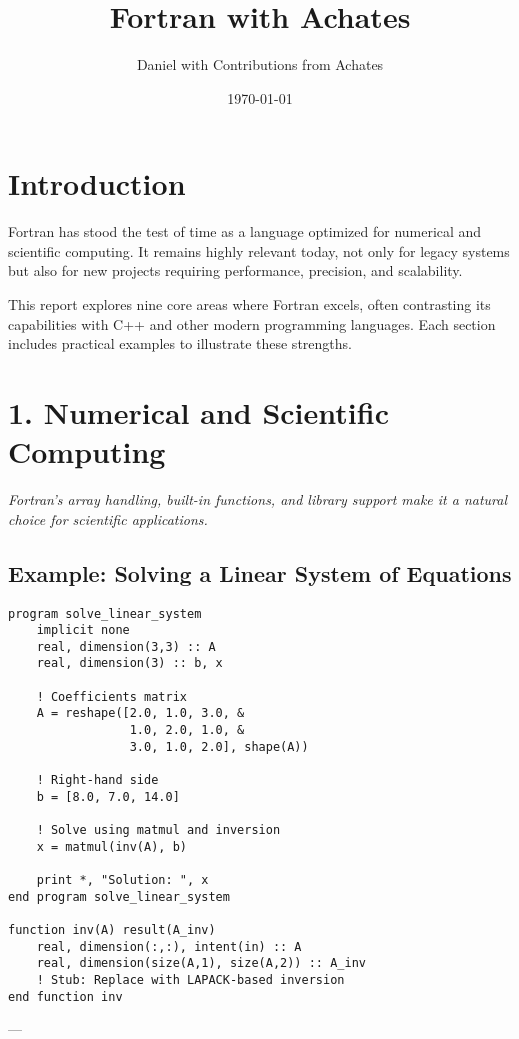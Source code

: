\documentclass[a4paper,11pt]{article}
\title{Fortran with Achates}
\author{Daniel with Contributions from Achates}
\date{\today}
\begin{document}
\maketitle
\tableofcontents
\newpage

\section{Introduction}
Fortran has stood the test of time as a language optimized for numerical and scientific computing. It remains highly relevant today, not only for legacy systems but also for new projects requiring performance, precision, and scalability.

This report explores nine core areas where Fortran excels, often contrasting its capabilities with C++ and other modern programming languages. Each section includes practical examples to illustrate these strengths.

\section{1. Numerical and Scientific Computing}
\textit{Fortran’s array handling, built-in functions, and library support make it a natural choice for scientific applications.}

\subsection{Example: Solving a Linear System of Equations}
\begin{lstlisting}[caption={Solving a Linear System with Fortran}]
program solve_linear_system
    implicit none
    real, dimension(3,3) :: A
    real, dimension(3) :: b, x

    ! Coefficients matrix
    A = reshape([2.0, 1.0, 3.0, &
                 1.0, 2.0, 1.0, &
                 3.0, 1.0, 2.0], shape(A))

    ! Right-hand side
    b = [8.0, 7.0, 14.0]

    ! Solve using matmul and inversion
    x = matmul(inv(A), b)

    print *, "Solution: ", x
end program solve_linear_system

function inv(A) result(A_inv)
    real, dimension(:,:), intent(in) :: A
    real, dimension(size(A,1), size(A,2)) :: A_inv
    ! Stub: Replace with LAPACK-based inversion
end function inv
\end{lstlisting}

---
\end{document}
